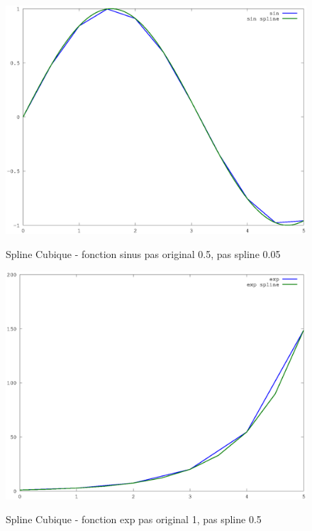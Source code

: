 \documentclass[a4paper,11pt]{article}
\begin{document}
\begin{figure}[h!]
  \begin{centering}
    \includegraphics[scale=0.5]{../sinus_10}
    \label{rspro2}
    \par\end{centering}
  \caption{Spline Cubique - fonction sinus pas original 0.5, pas spline 0.05}
  \label{fig:jacobi-conv}
\end{figure}


\begin{figure}[h!]
  \begin{centering}
    \includegraphics[scale=0.5]{../exp_2}
    \label{rspro2}
    \par\end{centering}
  \caption{Spline Cubique - fonction exp pas original 1, pas spline 0.5}
  \label{fig:jacobi-conv}
\end{figure}
\end{document}
